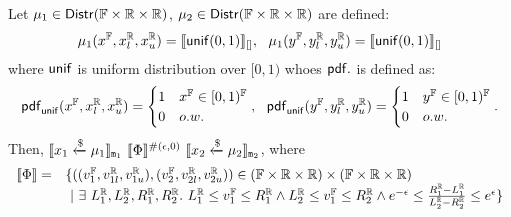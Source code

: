 \documentclass[a4paper,11pt]{article}
\begin{document}
%
%
\newpage
\begin{thm}
\label{thm:unif_coupling}
Let $\mu_1 \in \mathsf{Distr}(\mathbb{F} \times \mathbb{R} \times \mathbb{R})$, $\mu_2 \in \mathsf{Distr}(\mathbb{F} \times \mathbb{R} \times \mathbb{R})$ are defined:
\[
	\mu_1(x^{\mathbb{F}}, x^{\mathbb{R}}_l, x^{\mathbb{R}}_u) 
	= \llbracket \mathsf{unif}(0, 1) \rrbracket_{[]},
~~
	\mu_1(y^{\mathbb{F}}, y^{\mathbb{R}}_l, y^{\mathbb{R}}_u) 
	= \llbracket \mathsf{unif}(0, 1) \rrbracket_{[]}
\]
where $\mathsf{unif}$ is uniform distribution over $[0, 1)$ whoes $\mathsf{pdf}.$ is defined as:
\[
	\mathsf{pdf}_{\mathsf{unif}}(x^{\mathbb{F}}, x^{\mathbb{R}}_l, x^{\mathbb{R}}_u) = 
	\begin{cases}
	1 & x^{\mathbb{F}} \in [0, 1)^{\mathbb{F}}\\
	0       & o.w.
	\end{cases},
	~~
	\mathsf{pdf}_{\mathsf{unif}}(y^{\mathbb{F}}, y^{\mathbb{R}}_l, y^{\mathbb{R}}_u) = 
	\begin{cases}
	1 & y^{\mathbb{F}} \in [0, 1)^{\mathbb{F}}\\
	0       & o.w.
	\end{cases}.
\]
Then, $	\llbracket x_1 \xleftarrow{\$} \mu_1 \rrbracket_{\mathtt{m}_1} 
		~ \llbracket \Phi \rrbracket^{\#(\epsilon, 0)} ~
		\llbracket x_2 \xleftarrow{\$} \mu_2 \rrbracket_{\mathtt{m}_2}$, 
where
\[
\begin{array}{rl}
	\llbracket \Phi \rrbracket = &
	\{((v^{\mathbb{F}}_1, v^{\mathbb{R}}_{1l}, v^{\mathbb{R}}_{1u}), (v^{\mathbb{F}}_2, v^{\mathbb{R}}_{2l}, v^{\mathbb{R}}_{2u})) 
	\in (\mathbb{F} \times \mathbb{R} \times \mathbb{R}) \times (\mathbb{F} \times \mathbb{R} \times \mathbb{R})\\
	& ~|~
	\exists ~ L^{\mathbb{R}}_1, L^{\mathbb{R}}_2, R^{\mathbb{R}}_1, R^{\mathbb{R}}_2. ~
	L^{\mathbb{R}}_1 \leq v^{\mathbb{F}}_1 \leq R^{\mathbb{R}}_1 
	\land 
	L^{\mathbb{R}}_2 \leq v^{\mathbb{F}}_1 \leq R^{\mathbb{R}}_2
	\land
	e^{-\epsilon} \leq 
	\frac{R^{\mathbb{R}}_1 - L^{\mathbb{R}}_1}{L^{\mathbb{R}}_2 - R^{\mathbb{R}}_2}
	\leq e^{\epsilon}
	\}
\end{array}
\]
\end{thm}	
\end{document}
